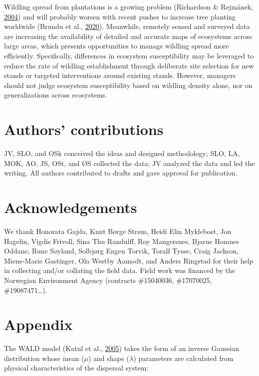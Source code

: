 \documentclass[
]{article}
\begin{document}
Wildling spread from plantations is a growing problem (Richardson \& Rejmánek, \protect\hyperlink{ref-richardsonConifersInvasiveAliens2004}{2004}) and will probably worsen with recent pushes to increase tree planting worldwide (Brundu et al., \protect\hyperlink{ref-brunduGlobalGuidelinesSustainable2020}{2020}).
Meanwhile, remotely sensed and surveyed data are increasing the availability of detailed and accurate maps of ecosystems across large areas, which presents opportunities to manage wildling spread more efficiently.
Specifically, differences in ecosystem susceptibility may be leveraged to
reduce the rate of wildling establishment through deliberate site selection for new stands or targeted interventions around existing stands.
However, managers should not judge ecosystem susceptibility based on wildling density alone, nor on generalizations across ecosystems.

\hypertarget{authors-contributions}{%
\section{Authors' contributions}\label{authors-contributions}}

JV, SLO, and OSk conceived the ideas and designed methodology; SLO, LA, MOK, AO, JS, OSt, and ØS collected the data; JV analyzed the data and led the writing. All authors contributed to drafts and gave approval for publication.

\hypertarget{acknowledgements}{%
\section{Acknowledgements}\label{acknowledgements}}

We thank Honorata Gajda, Knut Børge Strøm, Heidi Elin Myklebost, Jon Hagelin, Vigdis Frivoll, Sina Thu Randulff, Roy Mangersnes, Bjarne Homnes Oddane, Rune Søyland, Solbjørg Engen Torvik, Toralf Tysse, Craig Jackson, Miene-Marie Gastinger, Ola Westby Aamodt, and Anders Ringstad for their help in collecting and/or collating the field data. Field work was financed by the Norwegian Environment Agency (contracts \#15040036, \#17070025, \#19087471\ldots).

\newpage

\hypertarget{appendix}{%
\section{Appendix}\label{appendix}}

The WALD model (Katul et al., \protect\hyperlink{ref-katulMechanisticAnalyticalModels2005}{2005}) takes the form of an inverse Gaussian distribution whose mean (\(\mu\)) and shape (\(\lambda\)) parameters are calculated from physical characteristics of the dispersal system:
\end{document}
